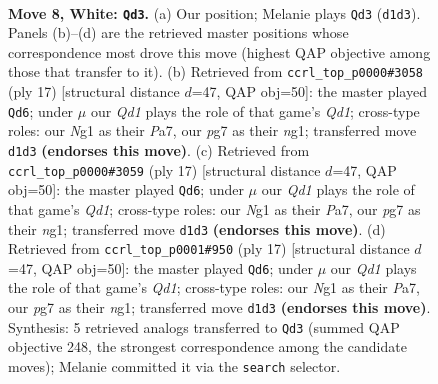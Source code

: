 \documentclass[11pt]{article}
\begin{document}
\begin{figure}[p]\centering
\begin{subfigure}{0.46\textwidth}\centering
\resizebox{\linewidth}{!}{%
\newchessgame
\chessboard[
  setfen={rnbqk2r/pp2npp1/4p3/2PpP2p/8/P1P5/2P2PPP/R1BQKBNR w KQkq - 0 8},
  showmover=false,
  pgfstyle=straightmove, color=movearrow, markmove={d1-d3}
]}
\caption{}
\end{subfigure}\hfill
\begin{subfigure}{0.46\textwidth}\centering
\resizebox{\linewidth}{!}{%
\newchessgame
\chessboard[
  setfen={rnbqk2r/ppp1bp1p/8/3Ppp2/2P5/2N5/PP3PPP/R2QKBNR b KQkq - 1 9},
  showmover=false,
  pgfstyle=straightmove, color=movearrow, markmove={d8-d6}
]}
\caption{}
\end{subfigure}
\\[4pt]
\begin{subfigure}{0.46\textwidth}\centering
\resizebox{\linewidth}{!}{%
\newchessgame
\chessboard[
  setfen={rnbqk2r/ppp1bp1p/8/3Ppp2/2P5/2N5/PP3PPP/R2QKBNR b KQkq - 1 9},
  showmover=false,
  pgfstyle=straightmove, color=movearrow, markmove={d8-d6}
]}
\caption{}
\end{subfigure}\hfill
\begin{subfigure}{0.46\textwidth}\centering
\resizebox{\linewidth}{!}{%
\newchessgame
\chessboard[
  setfen={rnbqk2r/ppp1bp1p/8/3Ppp2/2P5/2N5/PP3PPP/R2QKBNR b KQkq - 1 9},
  showmover=false,
  pgfstyle=straightmove, color=movearrow, markmove={d8-d6}
]}
\caption{}
\end{subfigure}
\caption{\textbf{Move 8, White: \texttt{Qd3}.} (a) Our position; Melanie plays \texttt{Qd3} (\texttt{d1d3}). Panels (b)--(d) are the retrieved master positions whose correspondence most drove this move (highest QAP objective among those that transfer to it). (b) Retrieved from \texttt{ccrl\_top\_p0000\#3058} (ply 17) [structural distance $d$=47, QAP obj=50]: the master played \texttt{Qd6}; under $\mu$ our \emph{Qd1} plays the role of that game's \emph{Qd1}; cross-type roles: our \emph{N}g1 as their \emph{P}a7, our \emph{p}g7 as their \emph{n}g1; transferred move \texttt{d1d3} \textbf{(endorses this move)}. (c) Retrieved from \texttt{ccrl\_top\_p0000\#3059} (ply 17) [structural distance $d$=47, QAP obj=50]: the master played \texttt{Qd6}; under $\mu$ our \emph{Qd1} plays the role of that game's \emph{Qd1}; cross-type roles: our \emph{N}g1 as their \emph{P}a7, our \emph{p}g7 as their \emph{n}g1; transferred move \texttt{d1d3} \textbf{(endorses this move)}. (d) Retrieved from \texttt{ccrl\_top\_p0001\#950} (ply 17) [structural distance $d$=47, QAP obj=50]: the master played \texttt{Qd6}; under $\mu$ our \emph{Qd1} plays the role of that game's \emph{Qd1}; cross-type roles: our \emph{N}g1 as their \emph{P}a7, our \emph{p}g7 as their \emph{n}g1; transferred move \texttt{d1d3} \textbf{(endorses this move)}. Synthesis: 5 retrieved analogs transferred to \texttt{Qd3} (summed QAP objective 248, the strongest correspondence among the candidate moves); Melanie committed it via the \texttt{search} selector.}
\label{fig:thought-m14}
\end{figure}
\end{document}

